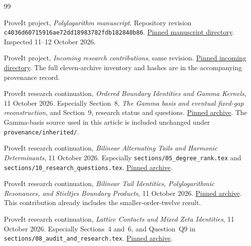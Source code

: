\begin{thebibliography}{99}
\raggedright
{}

ProveIt project, \emph{Polylogarithm manuscript}.
Repository revision \texttt{c4036d60715916ae72dd18983782fdb182840b86}.
\href{https://github.com/VladimirReshetnikov/ProveIt/tree/c4036d60715916ae72dd18983782fdb182840b86/Analysis/Polylogarithms/docs/manuscript}{Pinned manuscript directory}.
Inspected 11--12 October 2026.

ProveIt project, \emph{Incoming research contributions}, same revision.
\href{https://github.com/VladimirReshetnikov/ProveIt/tree/c4036d60715916ae72dd18983782fdb182840b86/docs/incoming}{Pinned incoming directory}.
The full eleven-archive inventory and hashes are in the accompanying
provenance record.

ProveIt research continuation,
\emph{Ordered Boundary Identities and Gamma Kernels}, 11 October 2026.
Especially Section~8, \emph{The Gamma basis and eventual fixed-gap
reconstruction}, and Section~9, research status and questions.
\href{https://github.com/VladimirReshetnikov/ProveIt/blob/c4036d60715916ae72dd18983782fdb182840b86/docs/incoming/ProveIt_Ordered_Boundary_Identities_2026-10-11.zip}{Pinned archive}.
The Gamma-basis source used in this article is included unchanged
under \texttt{provenance/inherited/}.

ProveIt research continuation,
\emph{Bilinear Alternating Tails and Harmonic Determinants},
11 October 2026. Especially
\texttt{sections/05\_degree\_rank.tex} and
\texttt{sections/10\_research\_questions.tex}.
\href{https://github.com/VladimirReshetnikov/ProveIt/blob/c4036d60715916ae72dd18983782fdb182840b86/docs/incoming/ProveIt_Bilinear_Tails_and_Determinants_2026-10-11.zip}{Pinned archive}.

ProveIt research continuation,
\emph{Bilinear Tail Identities, Polylogarithmic Resonances,
and Stieltjes Boundary Products}, 11 October 2026.
\href{https://github.com/VladimirReshetnikov/ProveIt/blob/c4036d60715916ae72dd18983782fdb182840b86/docs/incoming/ProveIt_Tail_Kernels_and_Boundary_Products_2026-10-11.zip}{Pinned archive}.
This contribution already includes the smaller-order-twelve result.

ProveIt research continuation,
\emph{Lattice Contacts and Mixed Zeta Identities},
11 October 2026. Especially Sections~4 and~6, and Question~Q9
in \texttt{sections/08\_audit\_and\_research.tex}.
\href{https://github.com/VladimirReshetnikov/ProveIt/blob/c4036d60715916ae72dd18983782fdb182840b86/docs/incoming/ProveIt_Lattice_Contacts_and_Mixed_Zeta_Identities_2026-10-11.zip}{Pinned archive}.


\end{thebibliography}
